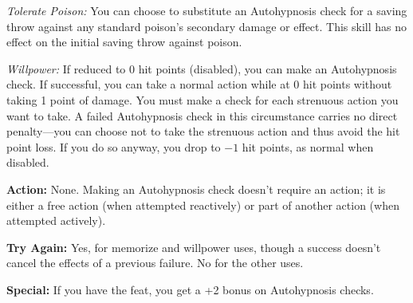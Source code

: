 \textit{Tolerate Poison:} You can choose to substitute an Autohypnosis check for a saving throw against any standard poison's secondary damage or effect. This skill has no effect on the initial saving throw against poison.

\textit{Willpower:} If reduced to 0 hit points (disabled), you can make an Autohypnosis check. If successful, you can take a normal action while at 0 hit points without taking 1 point of damage. You must make a check for each strenuous action you want to take. A failed Autohypnosis check in this circumstance carries no direct penalty---you can choose not to take the strenuous action and thus avoid the hit point loss. If you do so anyway, you drop to $-1$ hit points, as normal when disabled.

\textbf{Action:} None. Making an Autohypnosis check doesn't require an action; it is either a free action (when attempted reactively) or part of another action (when attempted actively).

\textbf{Try Again:} Yes, for memorize and willpower uses, though a success doesn't cancel the effects of a previous failure. No for the other uses.

\textbf{Special:} If you have the  feat, you get a +2 bonus on Autohypnosis checks.